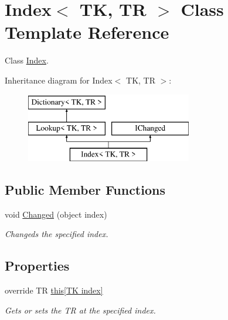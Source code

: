 \hypertarget{class_index}{}\section{Index$<$ TK, TR $>$ Class Template Reference}
\label{class_index}


Class \hyperlink{class_index}{Index}.  


Inheritance diagram for Index$<$ TK, TR $>$\+:\begin{figure}[H]
\begin{center}
\leavevmode
\includegraphics[height=3.000000cm]{class_index}
\end{center}
\end{figure}
\subsection*{Public Member Functions}
\begin{DoxyCompactItemize}
\item 
void \hyperlink{class_index_a3e67374081c64d8097112ab9286bbf1b}{Changed} (object index)
\begin{DoxyCompactList}\small\item\em Changeds the specified index. \end{DoxyCompactList}\end{DoxyCompactItemize}
\subsection*{Properties}
\begin{DoxyCompactItemize}
\item 
override TR \hyperlink{class_index_a55f528c0402412e4a0223895b89d559f}{this\mbox{[}\+T\+K index\mbox{]}}
\begin{DoxyCompactList}\small\item\em Gets or sets the TR at the specified index. \end{DoxyCompactList}\end{DoxyCompactItemize}
